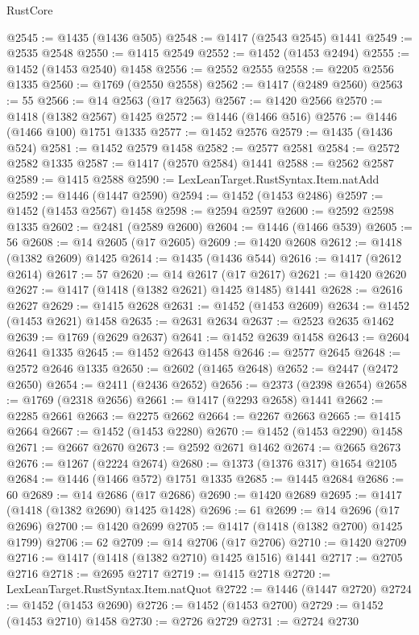 \begin{lexlean}{RustCore}
\begin{coremodule}
@2545 := @1435 (@1436 @505)
@2548 := @1417 (@2543 @2545) @1441
@2549 := @2535 @2548
@2550 := @1415 @2549
@2552 := @1452 (@1453 @2494)
@2555 := @1452 (@1453 @2540) @1458
@2556 := @2552 @2555
@2558 := @2205 @2556 @1335
@2560 := @1769 (@2550 @2558)
@2562 := @1417 (@2489 @2560)
@2563 := 55
@2566 := @14 @2563 (@17 @2563)
@2567 := @1420 @2566
@2570 := @1418 (@1382 @2567) @1425
@2572 := @1446 (@1466 @516)
@2576 := @1446 (@1466 @100) @1751 @1335
@2577 := @1452 @2576
@2579 := @1435 (@1436 @524)
@2581 := @1452 @2579 @1458
@2582 := @2577 @2581
@2584 := @2572 @2582 @1335
@2587 := @1417 (@2570 @2584) @1441
@2588 := @2562 @2587
@2589 := @1415 @2588
@2590 := LexLeanTarget.RustSyntax.Item.natAdd
@2592 := @1446 (@1447 @2590)
@2594 := @1452 (@1453 @2486)
@2597 := @1452 (@1453 @2567) @1458
@2598 := @2594 @2597
@2600 := @2592 @2598 @1335
@2602 := @2481 (@2589 @2600)
@2604 := @1446 (@1466 @539)
@2605 := 56
@2608 := @14 @2605 (@17 @2605)
@2609 := @1420 @2608
@2612 := @1418 (@1382 @2609) @1425
@2614 := @1435 (@1436 @544)
@2616 := @1417 (@2612 @2614)
@2617 := 57
@2620 := @14 @2617 (@17 @2617)
@2621 := @1420 @2620
@2627 := @1417 (@1418 (@1382 @2621) @1425 @1485) @1441
@2628 := @2616 @2627
@2629 := @1415 @2628
@2631 := @1452 (@1453 @2609)
@2634 := @1452 (@1453 @2621) @1458
@2635 := @2631 @2634
@2637 := @2523 @2635 @1462
@2639 := @1769 (@2629 @2637)
@2641 := @1452 @2639 @1458
@2643 := @2604 @2641 @1335
@2645 := @1452 @2643 @1458
@2646 := @2577 @2645
@2648 := @2572 @2646 @1335
@2650 := @2602 (@1465 @2648)
@2652 := @2447 (@2472 @2650)
@2654 := @2411 (@2436 @2652)
@2656 := @2373 (@2398 @2654)
@2658 := @1769 (@2318 @2656)
@2661 := @1417 (@2293 @2658) @1441
@2662 := @2285 @2661
@2663 := @2275 @2662
@2664 := @2267 @2663
@2665 := @1415 @2664
@2667 := @1452 (@1453 @2280)
@2670 := @1452 (@1453 @2290) @1458
@2671 := @2667 @2670
@2673 := @2592 @2671 @1462
@2674 := @2665 @2673
@2676 := @1267 (@2224 @2674)
@2680 := @1373 (@1376 @317) @1654 @2105
@2684 := @1446 (@1466 @572) @1751 @1335
@2685 := @1445 @2684
@2686 := 60
@2689 := @14 @2686 (@17 @2686)
@2690 := @1420 @2689
@2695 := @1417 (@1418 (@1382 @2690) @1425 @1428)
@2696 := 61
@2699 := @14 @2696 (@17 @2696)
@2700 := @1420 @2699
@2705 := @1417 (@1418 (@1382 @2700) @1425 @1799)
@2706 := 62
@2709 := @14 @2706 (@17 @2706)
@2710 := @1420 @2709
@2716 := @1417 (@1418 (@1382 @2710) @1425 @1516) @1441
@2717 := @2705 @2716
@2718 := @2695 @2717
@2719 := @1415 @2718
@2720 := LexLeanTarget.RustSyntax.Item.natQuot
@2722 := @1446 (@1447 @2720)
@2724 := @1452 (@1453 @2690)
@2726 := @1452 (@1453 @2700)
@2729 := @1452 (@1453 @2710) @1458
@2730 := @2726 @2729
@2731 := @2724 @2730

\end{coremodule}
\end{lexlean}
